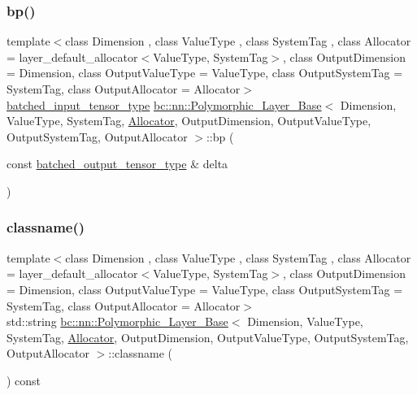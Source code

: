 \subsubsection{\texorpdfstring{bp()}{bp()}\hspace{0.1cm}{\footnotesize\ttfamily [2/2]}}
{\footnotesize\ttfamily template$<$class Dimension , class Value\+Type , class System\+Tag , class Allocator  = layer\+\_\+default\+\_\+allocator$<$\+Value\+Type, System\+Tag$>$, class Output\+Dimension  = Dimension, class Output\+Value\+Type  = Value\+Type, class Output\+System\+Tag  = System\+Tag, class Output\+Allocator  = Allocator$>$ \\
\hyperlink{structbc_1_1nn_1_1Polymorphic__Layer__Base_ae694b03dd73923ff973b0d2c9156e161}{batched\+\_\+input\+\_\+tensor\+\_\+type} \hyperlink{structbc_1_1nn_1_1Polymorphic__Layer__Base}{bc\+::nn\+::\+Polymorphic\+\_\+\+Layer\+\_\+\+Base}$<$ Dimension, Value\+Type, System\+Tag, \hyperlink{classbc_1_1allocators_1_1Allocator}{Allocator}, Output\+Dimension, Output\+Value\+Type, Output\+System\+Tag, Output\+Allocator $>$\+::bp (\begin{DoxyParamCaption}\item[{const \hyperlink{structbc_1_1nn_1_1Polymorphic__Layer__Base_a45ed57549be9c4e5c40c52168ca15ae9}{batched\+\_\+output\+\_\+tensor\+\_\+type} \&}]{delta }\end{DoxyParamCaption})\hspace{0.3cm}{\ttfamily [inline]}}

\mbox{\label{structbc_1_1nn_1_1Polymorphic__Layer__Base_a3a63312d3100e6a6c31ba6bd16578aa7}} 
\subsubsection{\texorpdfstring{classname()}{classname()}\hspace{0.1cm}{\footnotesize\ttfamily [1/2]}}
{\footnotesize\ttfamily template$<$class Dimension , class Value\+Type , class System\+Tag , class Allocator  = layer\+\_\+default\+\_\+allocator$<$\+Value\+Type, System\+Tag$>$, class Output\+Dimension  = Dimension, class Output\+Value\+Type  = Value\+Type, class Output\+System\+Tag  = System\+Tag, class Output\+Allocator  = Allocator$>$ \\
std\+::string \hyperlink{structbc_1_1nn_1_1Polymorphic__Layer__Base}{bc\+::nn\+::\+Polymorphic\+\_\+\+Layer\+\_\+\+Base}$<$ Dimension, Value\+Type, System\+Tag, \hyperlink{classbc_1_1allocators_1_1Allocator}{Allocator}, Output\+Dimension, Output\+Value\+Type, Output\+System\+Tag, Output\+Allocator $>$\+::classname (\begin{DoxyParamCaption}{ }\end{DoxyParamCaption}) const\hspace{0.3cm}{\ttfamily [inline]}}

